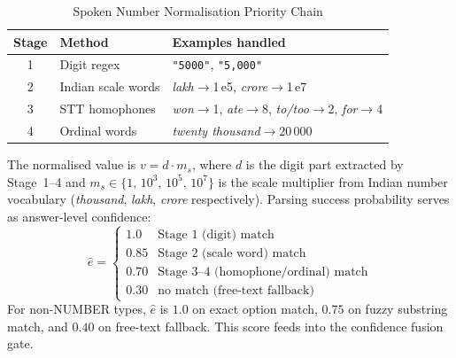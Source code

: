 \documentclass[runningheads]{llncs}
\begin{document}
\begin{table}[tbp]
  \caption{Spoken Number Normalisation Priority Chain}
  \label{tab:numstages}
  \centering
  \small
  \setlength{\tabcolsep}{5pt}
  \begin{tabular}{clp{5.5cm}}
    \toprule
    \textbf{Stage} & \textbf{Method} & \textbf{Examples handled} \\
    \midrule
    1 & Digit regex          & \texttt{"5000"}, \texttt{"5,000"} \\
    2 & Indian scale words   & \emph{lakh}$\!\to\!$1\,e5,
                               \emph{crore}$\!\to\!$1\,e7 \\
    3 & STT homophones       & \emph{won}$\!\to\!$1,
                               \emph{ate}$\!\to\!$8,
                               \emph{to/too}$\!\to\!$2,
                               \emph{for}$\!\to\!$4 \\
    4 & Ordinal words        & \emph{twenty thousand}$\!\to\!$20\,000 \\
    \bottomrule
  \end{tabular}
\end{table}

The normalised value is $v = d \cdot m_s$, where $d$ is the digit
part extracted by Stage~1--4 and $m_s \in \{1,\,10^3,\,10^5,\,10^7\}$
is the scale multiplier from Indian number vocabulary
(\emph{thousand}, \emph{lakh}, \emph{crore} respectively).
Parsing success probability serves as answer-level confidence:
\begin{equation}
  \hat{e} = \begin{cases}
    1.0  & \text{Stage 1 (digit) match} \\
    0.85 & \text{Stage 2 (scale word) match} \\
    0.70 & \text{Stage 3--4 (homophone/ordinal) match} \\
    0.30 & \text{no match (free-text fallback)}
  \end{cases}
  \label{eq:econf}
\end{equation}
For non-NUMBER types, $\hat{e}$ is $1.0$ on exact option match,
$0.75$ on fuzzy substring match, and $0.40$ on free-text fallback.
This score feeds into the confidence fusion gate.
\end{document}
